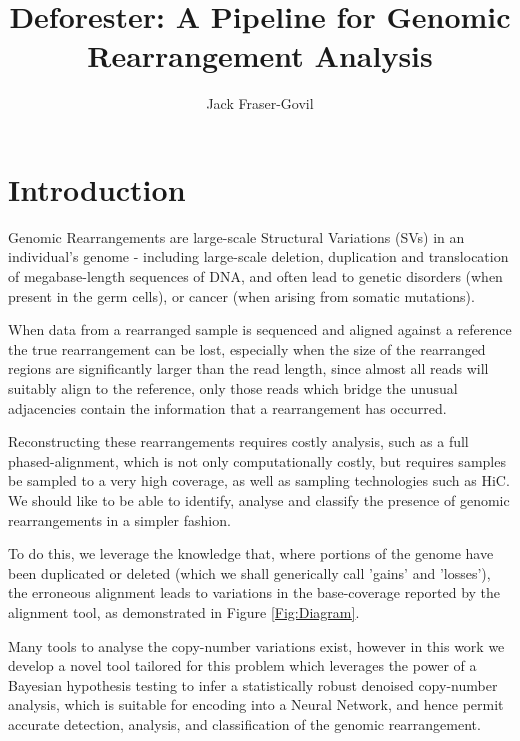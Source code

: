 \documentclass[fleqn,usenatbib]{mnras}
\title[Deforesting]{Deforester: A Pipeline for Genomic Rearrangement Analysis}
\author[J. Fraser-Govil]{Jack Fraser-Govil
}
\begin{document}
	\label{firstpage}
	\pagerange{\pageref{firstpage}--\pageref{lastpage}}
	\maketitle
	
	\section{Introduction}
	
		Genomic Rearrangements are large-scale Structural Variations (SVs) in an individual's genome - including large-scale deletion, duplication and translocation of megabase-length sequences of DNA,  and often lead to genetic disorders (when present in the germ cells), or cancer (when arising from somatic mutations). 

		When data from a rearranged sample is sequenced and aligned against a reference the true rearrangement can be lost, especially when the size of the rearranged regions are significantly larger than the read length, since almost all reads will suitably align to the reference, only those reads which bridge the unusual adjacencies contain the information that a rearrangement has occurred.

		Reconstructing these rearrangements requires costly analysis, such as a full phased-alignment, which is not only computationally costly, but requires samples be sampled to a very high coverage, as well as sampling technologies such as HiC. We should like to be able to identify, analyse and classify the presence of genomic rearrangements in a simpler fashion.  

		To do this, we leverage the knowledge that, where portions of the genome have been duplicated or deleted (which we shall generically call 'gains' and 'losses'), the erroneous alignment leads to variations in the base-coverage reported by the alignment tool, as demonstrated in Figure \ref{Fig:Diagram}.

		Many tools to analyse the copy-number variations exist, however in this work we develop a novel tool tailored for this problem which leverages the power of a Bayesian hypothesis testing to infer a statistically robust denoised copy-number analysis, which is suitable for encoding into a Neural Network, and hence permit accurate detection, analysis, and classification of the genomic rearrangement.
\end{document}
